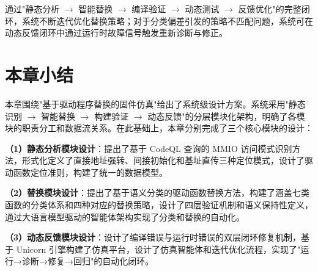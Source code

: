 通过"静态分析 $\to$ 智能替换 $\to$ 编译验证 $\to$ 动态测试 $\to$ 反馈优化"的完整闭环，系统不断迭代优化替换策略；对于分类偏差引发的策略不匹配问题，系统可在动态反馈闭环中通过运行时故障信号触发重新诊断与修正。

\section{本章小结}

本章围绕"基于驱动程序替换的固件仿真"给出了系统级设计方案。系统采用"静态识别 $\to$ 智能替换 $\to$ 构建验证 $\to$ 动态反馈"的分层模块化架构，明确了各模块的职责分工和数据流关系。在此基础上，本章分别完成了三个核心模块的设计：

\textbf{（1）静态分析模块设计}：提出了基于 CodeQL 查询的 MMIO 访问模式识别方法，形式化定义了直接地址强转、间接初始化和基址直传三种定位模式，设计了驱动函数定位准则，构建了统一的数据模型。

\textbf{（2）替换模块设计}：提出了基于语义分类的驱动函数替换方法，构建了涵盖七类函数的分类体系和四种对应的替换策略，设计了四层验证机制和语义保持性定义，通过大语言模型驱动的智能体架构实现了分类和替换的自动化。

\textbf{（3）动态反馈模块设计}：设计了编译错误与运行时错误的双层闭环修复机制，基于 Unicorn 引擎构建了仿真平台，设计了仿真智能体和迭代优化流程，实现了"运行→诊断→修复→回归"的自动化闭环。
